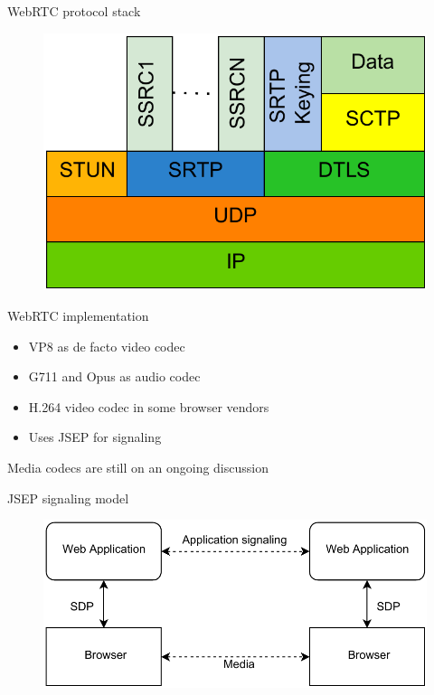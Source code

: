 \documentclass[first=red,second=purple,logo=yellowexc]{aaltoslides}
\begin{document}
\begin{frame}{WebRTC protocol stack}

\begin{figure}[h]
  \centering
  \includegraphics[width=1\textwidth]{protocolStack.pdf}
\end{figure}

\end{frame}

\begin{frame}{WebRTC implementation}

\begin{itemize}
\item VP8 as de facto video codec
\item G711 and Opus as audio codec
\item H.264 video codec in some browser vendors
\item Uses {\color{blue} JSEP} for signaling
\end{itemize}
\alert{Media codecs are still on an ongoing discussion}
\end{frame}


\begin{frame}{JSEP signaling model}

\begin{figure}[h]
  \centering
  \includegraphics[width=1\textwidth]{JSEP.pdf}
\end{figure}

\end{frame}
\end{document}
